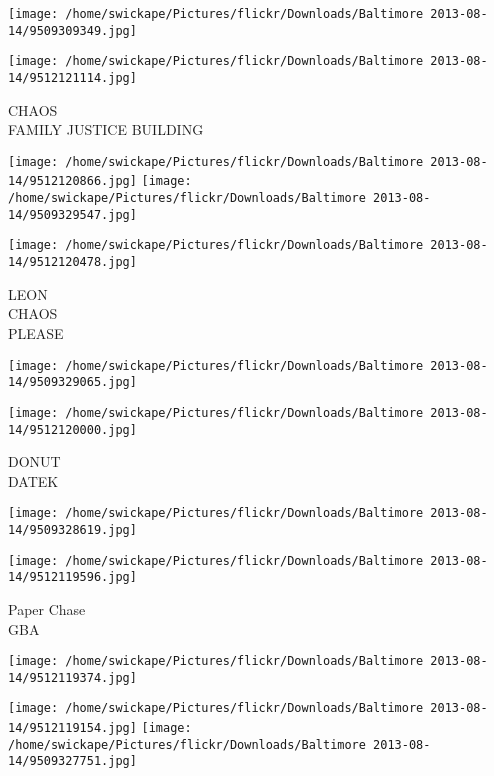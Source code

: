 \documentclass[10pt,letterpaper]{article}
\begin{document}
\texttt{[image: /home/swickape/Pictures/flickr/Downloads/Baltimore 2013-08-14/9509309349.jpg]}

\vspace{0.25in}
\texttt{[image: /home/swickape/Pictures/flickr/Downloads/Baltimore 2013-08-14/9512121114.jpg]}

CHAOS\\
FAMILY JUSTICE BUILDING\\
\pagebreak

\texttt{[image: /home/swickape/Pictures/flickr/Downloads/Baltimore 2013-08-14/9512120866.jpg]}
\texttt{[image: /home/swickape/Pictures/flickr/Downloads/Baltimore 2013-08-14/9509329547.jpg]}

\vspace{0.25in}
\texttt{[image: /home/swickape/Pictures/flickr/Downloads/Baltimore 2013-08-14/9512120478.jpg]}

LEON\\
CHAOS\\
PLEASE\\
\pagebreak

\texttt{[image: /home/swickape/Pictures/flickr/Downloads/Baltimore 2013-08-14/9509329065.jpg]}

\vspace{0.25in}
\texttt{[image: /home/swickape/Pictures/flickr/Downloads/Baltimore 2013-08-14/9512120000.jpg]}

DONUT\\
DATEK\\
\pagebreak

\texttt{[image: /home/swickape/Pictures/flickr/Downloads/Baltimore 2013-08-14/9509328619.jpg]}

\vspace{0.25in}
\texttt{[image: /home/swickape/Pictures/flickr/Downloads/Baltimore 2013-08-14/9512119596.jpg]}

Paper Chase\\
GBA\\
\pagebreak

\texttt{[image: /home/swickape/Pictures/flickr/Downloads/Baltimore 2013-08-14/9512119374.jpg]}

\vspace{0.25in}
\texttt{[image: /home/swickape/Pictures/flickr/Downloads/Baltimore 2013-08-14/9512119154.jpg]}
\texttt{[image: /home/swickape/Pictures/flickr/Downloads/Baltimore 2013-08-14/9509327751.jpg]}
\end{document}
